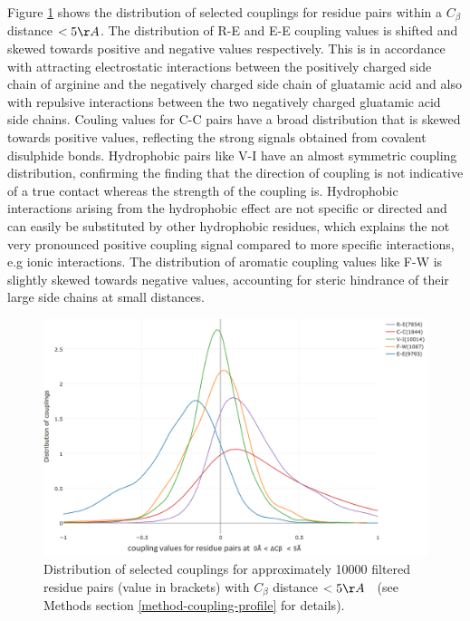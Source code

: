 \documentclass[12pt,a4paper,twoside]{book}
\newcommand{\Cb}{C_\beta}
\theoremstyle{definition}
\theoremstyle{definition}
\theoremstyle{remark}
\begin{document}
Figure \ref{fig:1d-coupling-profile-0-5} shows the distribution of
selected couplings for residue pairs within a \(\Cb\) distance
\(< 5\AA\). The distribution of R-E and E-E coupling values is shifted
and skewed towards positive and negative values respectively. This is in
accordance with attracting electrostatic interactions between the
positively charged side chain of arginine and the negatively charged
side chain of gluatamic acid and also with repulsive interactions
between the two negatively charged gluatamic acid side chains. Couling
values for C-C pairs have a broad distribution that is skewed towards
positive values, reflecting the strong signals obtained from covalent
disulphide bonds. Hydrophobic pairs like V-I have an almost symmetric
coupling distribution, confirming the finding that the direction of
coupling is not indicative of a true contact whereas the strength of the
coupling is. Hydrophobic interactions arising from the hydrophobic
effect are not specific or directed and can easily be substituted by
other hydrophobic residues, which explains the not very pronounced
positive coupling signal compared to more specific interactions, e.g
ionic interactions. The distribution of aromatic coupling values like
F-W is slightly skewed towards negative values, accounting for steric
hindrance of their large side chains at small distances.






\begin{figure}

{\centering \includegraphics[width=0.9\linewidth]{img/coupling_matrix_analysis/1d_coupling_profile_0_5} 

}

\caption{Distribution of selected couplings
for approximately 10000 filtered residue pairs (value in brackets) with
\(\Cb\) distance \(< 5\AA \; \;\) (see Methods section
\ref{method-coupling-profile} for details).}\label{fig:1d-coupling-profile-0-5}
\end{figure}
\end{document}

